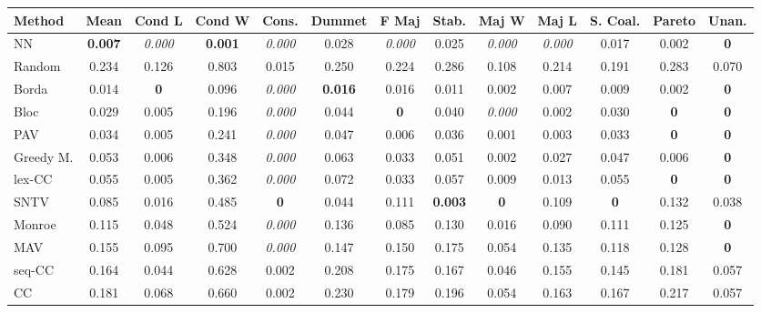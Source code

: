 \begin{tabular}{lcccccccccccc}
\toprule
Method & Mean & Cond L & Cond W & Cons. & Dummet & F Maj & Stab. & Maj W & Maj L & S. Coal. & Pareto & Unan. \\
\midrule
NN & \textbf{0.007} & \textit{0.000} & \textbf{0.001} & \textit{0.000} & 0.028 & \textit{0.000} & 0.025 & \textit{0.000} & \textit{0.000} & 0.017 & 0.002 & \textbf{0} \\
Random & 0.234 & 0.126 & 0.803 & 0.015 & 0.250 & 0.224 & 0.286 & 0.108 & 0.214 & 0.191 & 0.283 & 0.070 \\
Borda & 0.014 & \textbf{0} & 0.096 & \textit{0.000} & \textbf{0.016} & 0.016 & 0.011 & 0.002 & 0.007 & 0.009 & 0.002 & \cellcolor{green!25}\textbf{0} \\
Bloc & 0.029 & 0.005 & 0.196 & \textit{0.000} & 0.044 & \cellcolor{green!25}\textbf{0} & 0.040 & \textit{0.000} & 0.002 & 0.030 & \cellcolor{green!25}\textbf{0} & \cellcolor{green!25}\textbf{0} \\
PAV & 0.034 & 0.005 & 0.241 & \textit{0.000} & 0.047 & 0.006 & 0.036 & 0.001 & 0.003 & 0.033 & \cellcolor{green!25}\textbf{0} & \textbf{0} \\
Greedy M. & 0.053 & 0.006 & 0.348 & \cellcolor{green!25}\textit{0.000} & 0.063 & 0.033 & 0.051 & 0.002 & 0.027 & \cellcolor{green!25}0.047 & 0.006 & \cellcolor{green!25}\textbf{0} \\
lex-CC & 0.055 & 0.005 & 0.362 & \textit{0.000} & 0.072 & 0.033 & 0.057 & 0.009 & 0.013 & 0.055 & \textbf{0} & \textbf{0} \\
SNTV & 0.085 & 0.016 & 0.485 & \cellcolor{green!25}\textbf{0} & 0.044 & 0.111 & \textbf{0.003} & \cellcolor{green!25}\textbf{0} & 0.109 & \cellcolor{green!25}\textbf{0} & 0.132 & 0.038 \\
Monroe & 0.115 & 0.048 & 0.524 & \cellcolor{green!25}\textit{0.000} & 0.136 & 0.085 & 0.130 & 0.016 & 0.090 & 0.111 & 0.125 & \cellcolor{green!25}\textbf{0} \\
MAV & 0.155 & 0.095 & 0.700 & \textit{0.000} & 0.147 & 0.150 & 0.175 & 0.054 & 0.135 & 0.118 & 0.128 & \textbf{0} \\
seq-CC & 0.164 & 0.044 & 0.628 & 0.002 & 0.208 & 0.175 & 0.167 & 0.046 & 0.155 & 0.145 & 0.181 & 0.057 \\
CC & 0.181 & 0.068 & 0.660 & \cellcolor{green!25}0.002 & 0.230 & 0.179 & 0.196 & 0.054 & 0.163 & 0.167 & 0.217 & 0.057 \\
\bottomrule
\end{tabular}
